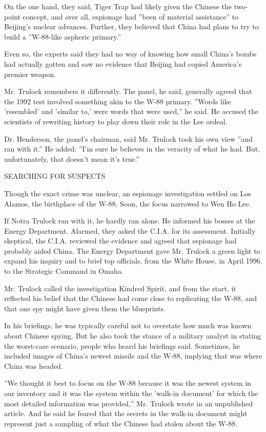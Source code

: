 On the one hand, they said, Tiger Trap had likely given the Chinese the
two-point concept, and over all, espionage had ''been of material
assistance'' to Beijing's nuclear advances. Further, they believed that
China had plans to try to build a ''W-88-like aspheric primary.''

Even so, the experts said they had no way of knowing how small China's
bombs had actually gotten and saw no evidence that Beijing had copied
America's premier weapon.

Mr. Trulock remembers it differently. The panel, he said, generally
agreed that the 1992 test involved something akin to the W-88 primary.
''Words like 'resembled' and 'similar to,' were words that were used,''
he said. He accused the scientists of rewriting history to play down
their role in the Lee ordeal.

Dr. Henderson, the panel's chairman, said Mr. Trulock took his own view
''and ran with it.'' He added: ''I'm sure he believes in the veracity of
what he had. But, unfortunately, that doesn't mean it's true.''

SEARCHING FOR SUSPECTS

Though the exact crime was unclear, an espionage investigation settled
on Los Alamos, the birthplace of the W-88. Soon, the focus narrowed to
Wen Ho Lee.

If Notra Trulock ran with it, he hardly ran alone. He informed his
bosses at the Energy Department. Alarmed, they asked the C.I.A. for its
assessment. Initially skeptical, the C.I.A. reviewed the evidence and
agreed that espionage had probably aided China. The Energy Department
gave Mr. Trulock a green light to expand his inquiry and to brief top
officials, from the White House, in April 1996, to the Strategic Command
in Omaha.

Mr. Trulock called the investigation Kindred Spirit, and from the start,
it reflected his belief that the Chinese had come close to replicating
the W-88, and that one spy might have given them the blueprints.

In his briefings, he was typically careful not to overstate how much was
known about Chinese spying. But he also took the stance of a military
analyst in stating the worst-case scenario, people who heard his
briefings said. Sometimes, he included images of China's newest missile
and the W-88, implying that was where China was headed.

''We thought it best to focus on the W-88 because it was the newest
system in our inventory and it was the system within the 'walk-in
document' for which the most detailed information was provided,'' Mr.
Trulock wrote in an unpublished article. And he said he feared that the
secrets in the walk-in document might represent just a sampling of what
the Chinese had stolen about the W-88.

